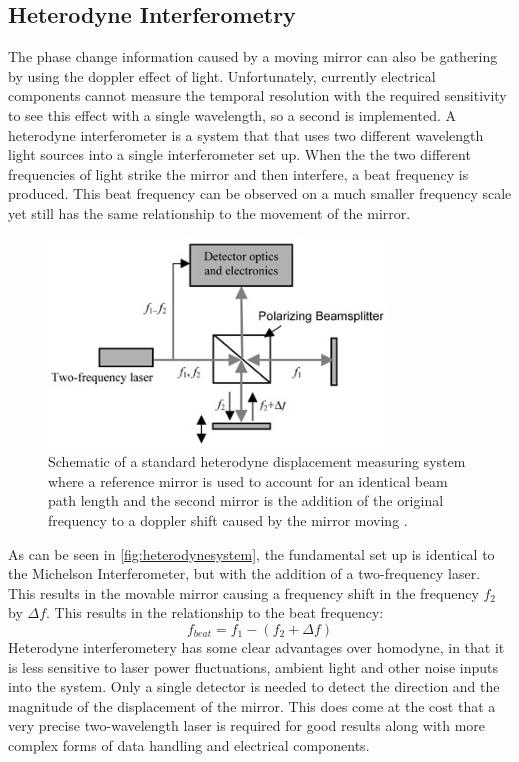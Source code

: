 \documentclass[12pt,a4paper,oneside]{report}
\begin{document}
	\subsection{Heterodyne Interferometry}
The phase change information caused by a moving mirror can also be gathering by using the doppler effect of light. Unfortunately, currently electrical components cannot measure the temporal resolution with the required sensitivity to see this effect with a single wavelength, so a second is implemented. A heterodyne interferometer is a system that that uses two different wavelength light sources into a single interferometer set up. When the the two different frequencies of light strike the mirror and then interfere, a beat frequency is produced. This beat frequency can be observed on a much smaller frequency scale yet still has the same relationship to the movement of the mirror.

\begin{figure}[H]
\includegraphics[width=0.8\textwidth, center,angle=0]{Images/heterodyne_system.jpg}
\caption{Schematic of a standard heterodyne displacement measuring system where a reference mirror is used to account for an identical beam path length and the second mirror is the addition of the original frequency to a doppler shift caused by the mirror moving \cite{HeterodyneInterferometer}.}
\label{fig:heterodynesystem}
\end{figure}

As can be seen in \autoref{fig:heterodynesystem}, the fundamental set up is identical to the Michelson Interferometer, but with the addition of a two-frequency laser. This results in the movable mirror causing a frequency shift in the frequency $f_{2}$ by $\Delta f$. This results in the relationship to the beat frequency:
\begin{equation}
f_{beat} = f_{1} - (f_{2} + \Delta f)
	\label{eq:dopplershift}
\end{equation}
Heterodyne interferometery has some clear advantages over homodyne, in that it is less sensitive to laser power fluctuations, ambient light and other noise inputs into the system. Only a single detector is needed to detect the direction and the magnitude of the displacement of the mirror. This does come at the cost that a very precise two-wavelength laser is required for good results along with more complex forms of data handling and electrical components.
    
\end{document}

